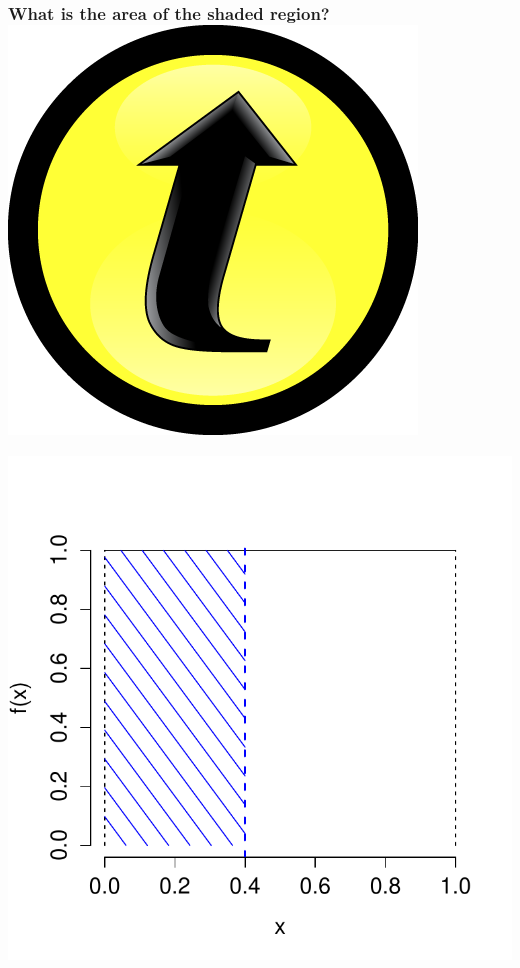 \documentclass[handout]{beamer}
\begin{document}
\begin{frame}
\frametitle{What is the area of the shaded region? \hfill \includegraphics[scale = 0.05]{./images/clicker}}
\centering
	\includegraphics[scale = 0.6]{./images/uniform_density_cdf}

\end{frame}


\end{document}
